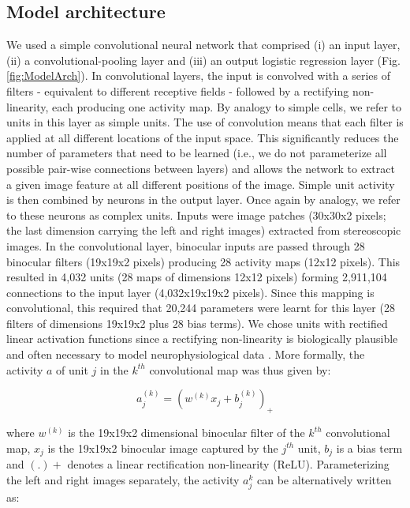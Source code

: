 \subsection{Model architecture}

We used a simple convolutional neural network that comprised (i) an input layer, (ii) a convolutional-pooling layer and (iii) an output logistic regression layer (Fig. \ref{fig:ModelArch}). In convolutional layers, the input is convolved with a series of filters - equivalent to different receptive fields - followed by a rectifying non-linearity, each producing one activity map. By analogy to simple cells, we refer to units in this layer as simple units. The use of convolution means that each filter is applied at all different locations of the input space. This significantly reduces the number of parameters that need to be learned (i.e., we do not parameterize all possible pair-wise connections between layers) and allows the network to extract a given image feature at all different positions of the image. Simple unit activity is then combined by neurons in the output layer. Once again by analogy, we refer to these neurons as complex units.
Inputs were image patches (30x30x2 pixels; the last dimension carrying the left and right images) extracted from stereoscopic images. In the convolutional layer, binocular inputs are passed through 28 binocular filters (19x19x2 pixels) producing 28 activity maps (12x12 pixels). This resulted in 4,032 units (28 maps of dimensions 12x12 pixels) forming 2,911,104 connections to the input layer (4,032x19x19x2 pixels). Since this mapping is convolutional, this required that 20,244 parameters were learnt for this layer (28 filters of dimensions 19x19x2 plus 28 bias terms). We chose units with rectified linear activation functions since a rectifying non-linearity is biologically plausible and often necessary to model neurophysiological data \cite{Adelson:1985ov,Movshon:1978dq}. More formally, the activity $a$ of unit $j$ in the $k^{th}$ convolutional map was thus given by:

\begin{equation}
  a_j^{(k)}=(w^{(k)} x_j+b_j^{(k)} )_+
\end{equation}

where $w^{(k)}$ is the 19x19x2 dimensional binocular filter of the $k^{th}$ convolutional map, $x_j$ is the 19x19x2 binocular image captured by the $j^{th}$ unit, $b_j$ is a bias term and $(.)+$ denotes a linear rectification non-linearity (ReLU). Parameterizing the left and right images separately, the activity $a_j^k$ can be alternatively written as:


